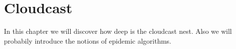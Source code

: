 \chapter{Cloudcast}
In this chapter we will discover how deep is the cloudcast
nest. \cite{Cloudcast} \cite{CYCLON}
Also we will probabily introduce the notions of epidemic algorithms. \cite{EpidemicAlgorithms}
